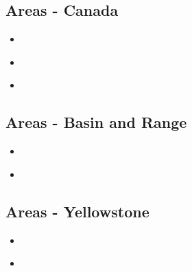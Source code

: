 \subsection{Areas - Canada}

\begin{scriptsize}
\begin{itemize}
\item[\nineteeneighty]
\textcite{roke80} \\
\item[\nineteenninetythree]
\textcite{brbw93} \\
\item[\nineteenninetynine]
\textcite{pelj99} \\
\end{itemize}
\end{scriptsize}

\subsection{Areas - Basin and Range}

\begin{scriptsize}
\begin{itemize}
\item[\nineteeneightynine]
\textcite{brbe89c} \\
\item[\twothousandnine]
\textcite{wefr09} \\
\end{itemize}
\end{scriptsize}

\subsection{Areas - Yellowstone}

\begin{scriptsize}
\begin{itemize}
\item[\twothousandthirteen]
\textcite{chus13} \\
\item[\twothousandeighteen]
\textcite{rekp18} \\
\end{itemize}
\end{scriptsize}

